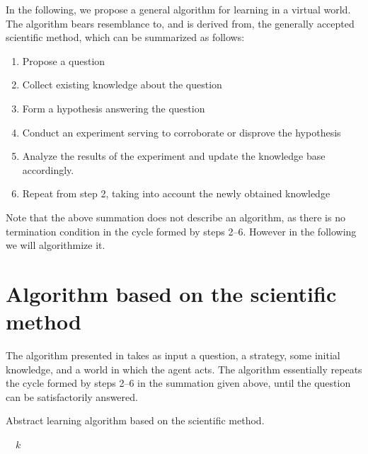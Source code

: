 \documentclass[\master/Master.tex]{subfiles}
\begin{document}
In the following, we propose a general algorithm for learning in a virtual world. The algorithm bears resemblance to, and is derived from, the generally accepted scientific method, which can be summarized as follows:

\begin{enumerate}
    \item Propose a question
    \item Collect existing knowledge about the question
    \item Form a hypothesis answering the question
    \item Conduct an experiment serving to corroborate or disprove the hypothesis
    \item Analyze the results of the experiment and update the knowledge base accordingly.
    \item Repeat from step 2, taking into account the newly obtained knowledge
\end{enumerate}

Note that the above summation does not describe an algorithm, as there is no termination condition in the cycle formed by steps 2--6. However in the following we will algorithmize it.

\section{Algorithm based on the scientific method}

The algorithm presented in  takes as input a question, a strategy, some initial knowledge, and a world in which the agent acts. The algorithm essentially repeats the cycle formed by steps 2--6 in the summation given above, until the question can be satisfactorily answered.


\begin{algorithm}
    \caption{Abstract learning algorithm based on the scientific method.}\label{algo:science}

    \begin{algorithmic}
                \Else%
                \EndIf%
            \EndWhile%
            \State~\Return~$k$
        \EndFunction%
    \end{algorithmic}
\end{algorithm}
\end{document}
